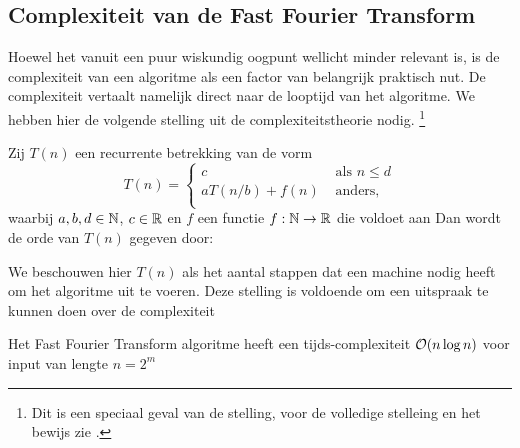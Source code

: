 \subsection{Complexiteit van de Fast Fourier Transform}
Hoewel het vanuit een puur wiskundig oogpunt wellicht minder relevant is, is de complexiteit van een algoritme
als een factor van belangrijk praktisch nut. De complexiteit vertaalt namelijk direct naar
de looptijd van het algoritme. We hebben hier de volgende stelling uit de complexiteitstheorie nodig.
\footnote{Dit is een speciaal geval van de stelling, voor de volledige stelleing en het bewijs zie \cite{akra-bazzi}.}

\begin{stelling}
  Zij $T(n)$ een recurrente betrekking van de vorm
  \[
  T(n) = \begin{cases}
    c &\text{ als } n \leq d \\
    a T(n/b) + f(n) &\text{ anders}, \\
  \end{cases}
  \]
  waarbij $a,b,d\in\mathbb{N}$, $c\in\mathbb{R}$ en $f$ een functie $f:\mathbb{N}\rightarrow\mathbb{R}$ die voldoet aan
  Dan wordt de orde van $T(n)$ gegeven door:
\end{stelling}
We beschouwen hier $T(n)$ als het aantal stappen dat een machine nodig heeft om het algoritme uit te voeren.
Deze stelling is voldoende om een uitspraak te kunnen doen over de complexiteit
\begin{stelling}
  Het Fast Fourier Transform algoritme heeft een tijds-complexiteit $\mathcal{O}(n\log n)$ voor input van lengte $n=2^m$
\end{stelling}
